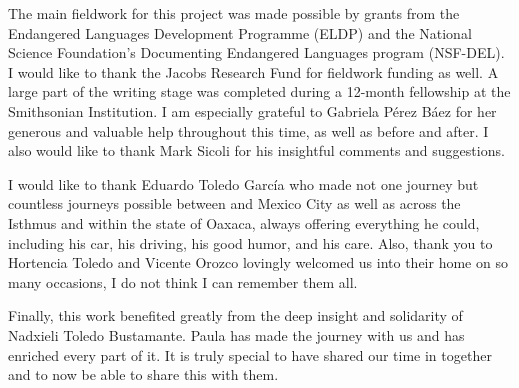 \begin{refsection}

The main fieldwork for this project was made possible by grants from the Endangered Languages Development Programme (ELDP) and the National Science Foundation's Documenting Endangered Languages program (NSF-DEL). I would like to thank the Jacobs Research Fund for fieldwork funding as well. A large part of the writing stage was completed during a 12-month fellowship at the Smithsonian Institution. I am especially grateful to Gabriela P\'{e}rez B\'{a}ez for her generous and valuable help throughout this time, as well as before and after. I also would like to thank Mark Sicoli for his insightful comments and suggestions.


I would like to thank Eduardo Toledo Garc\'{i}a who made not one journey but countless journeys possible between  and Mexico City as well as across the Isthmus and within the state of Oaxaca, always offering everything he could, including his car, his driving, his good humor, and his care. Also, thank you to Hortencia Toledo and Vicente Orozco lovingly welcomed us into their home on so many occasions, I do not think I can remember them all. 


Finally, this work benefited greatly from the deep insight and solidarity of Nadxieli Toledo Bustamante. Paula has made the journey with us and has enriched every part of it. It is truly special to have shared our time in  together and to now be able to share this with them.

\printbibliography[heading=subbibliography]
\end{refsection}

